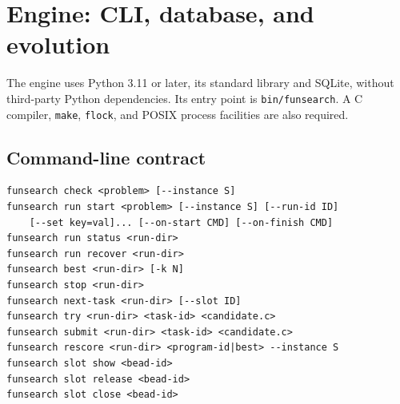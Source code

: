 \documentclass[11pt]{article}
\newcommand{\code}[1]{\texttt{#1}}
\begin{document}
\section{Engine: CLI, database, and evolution}
The engine uses Python 3.11 or later, its standard library and SQLite, without
third-party Python dependencies. Its entry point is \code{bin/funsearch}.
A C compiler, \code{make}, \code{flock}, and POSIX process facilities are also required.
\subsection{Command-line contract}
\begin{lstlisting}
funsearch check <problem> [--instance S]
funsearch run start <problem> [--instance S] [--run-id ID]
    [--set key=val]... [--on-start CMD] [--on-finish CMD]
funsearch run status <run-dir>
funsearch run recover <run-dir>
funsearch best <run-dir> [-k N]
funsearch stop <run-dir>
funsearch next-task <run-dir> [--slot ID]
funsearch try <run-dir> <task-id> <candidate.c>
funsearch submit <run-dir> <task-id> <candidate.c>
funsearch rescore <run-dir> <program-id|best> --instance S
funsearch slot show <bead-id>
funsearch slot release <bead-id>
funsearch slot close <bead-id>
\end{lstlisting}
\end{document}
